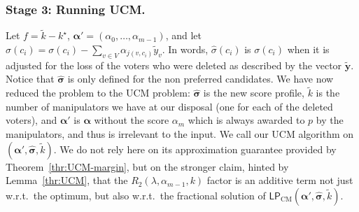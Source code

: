 \documentclass[letterpaper]{article} %
\theoremstyle{definition}
\newcommand\vecc{\mathbf}
\newcommand\vecgreek{\bm}
\newcommand{\veca}{\vecgreek{\alpha}}
\newcommand{\LPCM}{\mathsf{LP}_{\mathrm{CM}}}
\begin{document}
\subsubsection{Stage 3: Running UCM.} 
Let $f=\tilde{k}-k^\star$, $\veca'=(\alpha_{0},\ldots,\alpha_{m-1})$, and let  $\hat{\sigma}(c_i)=\sigma(c_i) - \sum_{v \in V}\alpha_{j(v,c_i)} \tilde{y}_{v}$. In words, $\hat{\sigma}(c_i)$ is $\sigma(c_i)$ when it is adjusted for the loss of the voters who were deleted as described by the vector $\tilde{\vecc{y}}$. Notice that $\hat{\vecgreek{\sigma}}$ is only defined for the non preferred candidates. We have now reduced the problem to the UCM problem: $\hat{\vecgreek{\sigma}}$ is the new score profile,  $\tilde{k}$ is the number of manipulators we have at our disposal (one for each of the deleted voters), and $\veca'$ is $\veca$ without the score $\alpha_m$ which is always awarded to $p$ by the manipulators, and thus is irrelevant to the input. We call our UCM algorithm on $(\veca', \hat{\vecgreek{\sigma}}, \tilde{k})$. We do not rely here on its approximation guarantee provided by Theorem~\ref{thr:UCM-margin}, but on the stronger claim, hinted by Lemma~\ref{thr:UCM}, that the $R_2(\lambda, \alpha_{m-1},k)$ factor is an additive term not just w.r.t.\ the optimum, but also w.r.t.\ the fractional solution of $\LPCM(\veca', \vecgreek{\hat{\sigma}}, \tilde{k})$. 
\end{document}
